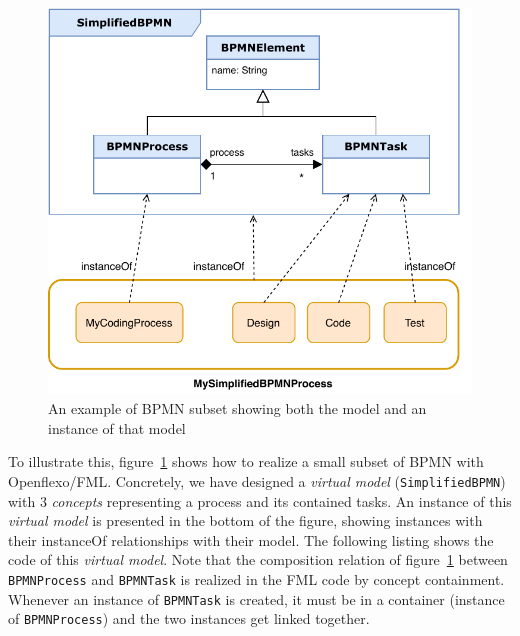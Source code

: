 \begin{figure}[t]
    \centering
    \includegraphics[width=\columnwidth]{Figures/BPMNSubsetExample.pdf}
    \caption{An example of BPMN subset showing both the model and an instance of that model}
    \label{fig:BPMNSubsetExample}
\end{figure}

To illustrate this, figure~\ref{fig:BPMNSubsetExample} shows how to realize a small subset of BPMN with Openflexo/FML. Concretely, we have designed a \textit{virtual model} (\texttt{SimplifiedBPMN}) with 3 \textit{concepts} representing a process and its contained tasks. An instance of this \textit{virtual model} is presented in the bottom of the figure, showing instances with their \textsf{instanceOf} relationships with their model.
%
The following listing shows the \FML code of this \textit{virtual model}. Note that the composition relation of figure~\ref{fig:BPMNSubsetExample} between \texttt{BPMNProcess} and \texttt{BPMNTask} is realized in the FML code by concept containment. Whenever an instance of \texttt{BPMNTask} is created, it must be in a container (instance of \texttt{BPMNProcess}) and the two instances get linked together. %


